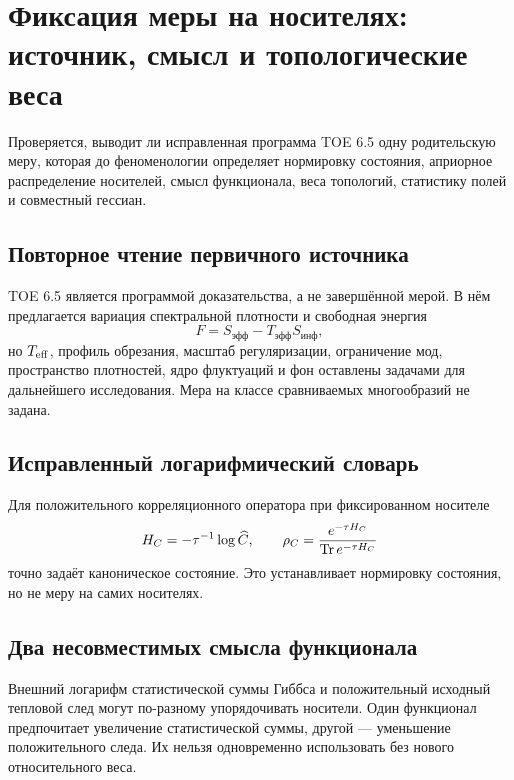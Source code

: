 \chapter{Фиксация меры на носителях: источник, смысл и топологические веса}

Проверяется, выводит ли исправленная программа TOE 6.5 одну родительскую
меру, которая до феноменологии определяет нормировку состояния, априорное
распределение носителей, смысл функционала, веса топологий, статистику полей
и совместный гессиан.

\section{Повторное чтение первичного источника}

TOE 6.5 является программой доказательства, а не завершённой мерой. В нём
предлагается вариация спектральной плотности и свободная энергия
\begin{equation}
 F=S_{\text{эфф}}-T_{\text{эфф}}S_{\text{инф}},
\end{equation}
но \(T_{\rm eff}\), профиль обрезания, масштаб регуляризации, ограничение
мод, пространство плотностей, ядро флуктуаций и фон оставлены задачами для
дальнейшего исследования. Мера на классе сравниваемых многообразий не задана.

\section{Исправленный логарифмический словарь}

Для положительного корреляционного оператора при фиксированном носителе
\begin{equation}
 H_C=-\tau^{-1}\log\widehat C,
 \qquad
 \rho_C=\frac{e^{-\tau H_C}}{\operatorname{Tr} e^{-\tau H_C}}
\end{equation}
точно задаёт каноническое состояние. Это устанавливает нормировку состояния,
но не меру на самих носителях.

\section{Два несовместимых смысла функционала}

Внешний логарифм статистической суммы Гиббса и положительный исходный
тепловой след могут по-разному упорядочивать носители. Один функционал
предпочитает увеличение статистической суммы, другой --- уменьшение
положительного следа. Их нельзя одновременно использовать без нового
относительного веса.

